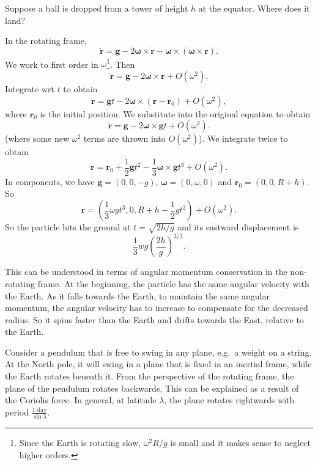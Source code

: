 \begin{example}
    Suppose a ball is dropped from a tower of height $h$ at the equator. Where does it land?

    In the rotating frame,
    \[
      \ddot{\mathbf{r}} = \mathbf{g} - 2\boldsymbol\omega\times \dot{\mathbf{r}} - \boldsymbol\omega\times(\boldsymbol\omega\times \mathbf{r}).
    \]
    We work to first order in $\omega$\footnote{Since the Earth is rotating slow, $ \omega^2R/g $ is small and it makes sense to neglect higher orders.}. Then
    \[
      \ddot{\mathbf{r}} = \mathbf{g} - 2\boldsymbol\omega\times \dot{\mathbf{r}} + O(\omega^2).
    \]
    Integrate wrt $t$ to obtain
    \[
      \dot{\mathbf{r}} = \mathbf{g}t - 2\boldsymbol\omega \times (\mathbf{r} - \mathbf{r}_0) + O(\omega^2),
    \]
    where $\mathbf{r}_0$ is the initial position. We substitute into the original equation to obtain
    \[
      \ddot{\mathbf{r}} = \mathbf{g} - 2\boldsymbol\omega\times \mathbf{g}t + O(\omega^2).
    \]
    (where some new $\omega^2$ terms are thrown into $O(\omega^2)$). We integrate twice to obtain
    \[
      \mathbf{r} = \mathbf{r}_0 + \frac{1}{2}\mathbf{g}t^2 - \frac{1}{3}\boldsymbol\omega \times \mathbf{g}t^3 + O(\omega^2).
    \]
    In components, we have $\mathbf{g} = (0, 0, -g)$, $\boldsymbol\omega = (0, \omega, 0)$ and $\mathbf{r}_0 = (0, 0, R + h)$. So
    \[
      \mathbf{r} = \left(\frac{1}{3}\omega gt^3, 0, R + h - \frac{1}{2}gt^2\right) + O(\omega^2).
    \]
    So the particle hits the ground at $t = \sqrt{2h/g}$ and its eastward displacement is
    \[
        \frac{1}{3}wg\left(\frac{2h}{g}\right)^{3/2}.
    \]
  
    This can be understood in terms of angular momentum conservation in the non-rotating frame. At the beginning, the particle has the same angular velocity with the Earth. As it falls towards the Earth, to maintain the same angular momentum, the angular velocity has to increase to compensate for the decreased radius. So it spins faster than the Earth and drifts towards the East, relative to the Earth.
\end{example}

\begin{example}
    Consider a pendulum that is free to swing in any plane, e.g.\ a weight on a string. At the North pole, it will swing in a plane that is fixed in an inertial frame, while the Earth rotates beneath it. From the perspective of the rotating frame, the plane of the pendulum rotates backwards. This can be explained as a result of the Coriolis force.
    In general, at latitude $\lambda$, the plane rotates rightwards with period $\frac{1\text{ day}}{\sin \lambda}$.
\end{example}